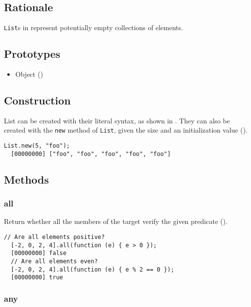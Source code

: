 \subsection{Rationale}

\lstinline|List|s in \us represent potentially empty collections of
elements.

\subsection{Prototypes}

\begin{itemize}
\item Object ()
\end{itemize}

\subsection{Construction}

List can be created with their literal syntax, as shown in
. They can also be created with the
\lstinline|new| method of \lstinline|List|, given the size and an
initialization value ().

\begin{lstlisting}[caption=List.new, label=lst:new-list,
  float=\floatposh]
  List.new(5, "foo");
  [00000000] ["foo", "foo", "foo", "foo", "foo"]
\end{lstlisting}

\subsection{Methods}

\subsubsection{all}

Return whether all the members of the target verify the given
predicate ().

\begin{lstlisting}[caption=List.all, label=lst:list-all, float=\floatposh]
  // Are all elements positive?
  [-2, 0, 2, 4].all(function (e) { e > 0 });
  [00000000] false
  // Are all elements even?
  [-2, 0, 2, 4].all(function (e) { e % 2 == 0 });
  [00000000] true
\end{lstlisting}

\subsubsection{any}


